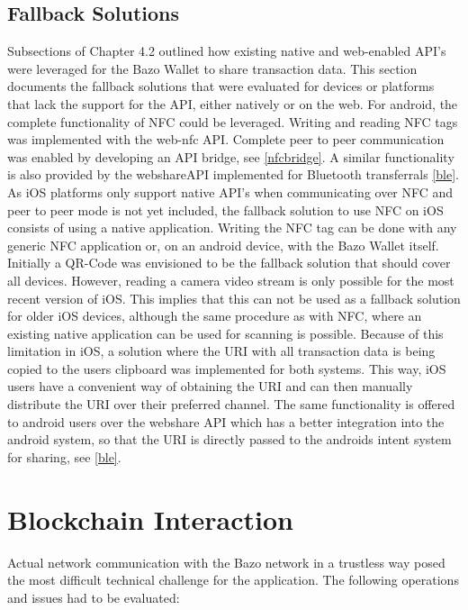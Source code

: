 \subsection{Fallback Solutions}\label{fallback}
Subsections of Chapter 4.2 outlined how existing native and web-enabled API's were leveraged for the Bazo Wallet to share transaction data. This section documents the fallback solutions that were evaluated for devices or platforms that lack the support for the API, either natively or on the web.
For android, the complete functionality of NFC could be leveraged. Writing and reading NFC tags was implemented with the web-nfc API. Complete peer to peer communication was enabled by developing an API bridge, see \ref{nfcbridge}. A similar functionality is also provided by the webshareAPI implemented for Bluetooth transferrals \ref{ble}.
As iOS platforms only support native API's when communicating over NFC and peer to peer mode is not yet included, the fallback solution to use NFC on iOS consists of using a native application. Writing the NFC tag can be done with any generic NFC application or, on an android device, with the Bazo Wallet itself.
Initially a QR-Code was envisioned to be the fallback solution that should cover all devices. However, reading a camera video stream is only possible for the most recent version of iOS. This implies that this can not be used as a fallback solution for older iOS devices, although the same procedure as with NFC, where an existing native application can be used for scanning is possible.
Because of this limitation in iOS, a solution where the URI with all transaction data is being copied to the users clipboard was implemented for both systems. This way, iOS users have a convenient way of obtaining the URI and can then manually distribute the URI over their preferred channel. The same functionality is offered to android users over the webshare API which has a better integration into the android system, so that the URI is directly passed to the androids intent system for sharing, see \ref{ble}.

\section{Blockchain Interaction}\label{blockchaininteraction}
Actual network communication with the Bazo network in a trustless way posed the most difficult technical challenge for the application. The following operations and issues had to be evaluated:


